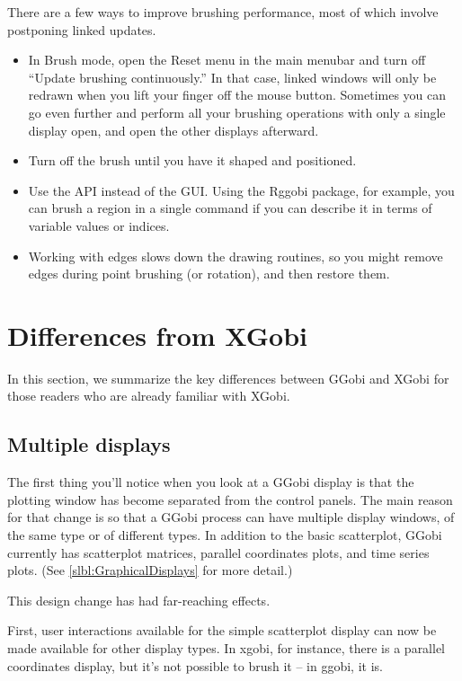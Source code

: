 \documentclass[11pt]{article}
\begin{document}
{There are a few ways to improve brushing performance, most of which
involve postponing linked updates.  
\begin{itemize}
\item In Brush mode, open the Reset menu in the main menubar and turn off
 ``Update brushing continuously.''  In that case, linked windows will only
 be redrawn when you lift your finger off the mouse button.  Sometimes you
 can go even further and perform all your brushing operations with only
 a single display open, and open the other displays afterward.
\item Turn off the brush until you have it shaped and positioned.
\item Use the API instead of the GUI.  Using the Rggobi package, for
 example, you can brush a region in a single command if you can describe
 it in terms of variable values or indices.
\item Working with edges slows down the drawing routines, so you might
 remove edges during point brushing (or rotation), and then restore them.
\end{itemize}

\newpage
\section{Differences from XGobi}
\label{slbl:xgobi}

In this section, we summarize the key differences between GGobi
and XGobi for those readers who are already familiar with XGobi.

\subsection {Multiple displays}

The first thing you'll notice when you look at a GGobi display is
that the plotting window has become separated from the control
panels.  The main reason for that change is so that a GGobi process
can have multiple display windows, of the same type or of different
types.  In addition to the basic scatterplot, GGobi currently has
scatterplot matrices, parallel coordinates plots, and time series
plots.  (See \ref{slbl:GraphicalDisplays} for more detail.)

This design change has had far-reaching effects.

First, user interactions available for the simple scatterplot display
can now be made available for other display types.  In xgobi, for
instance, there is a parallel coordinates display, but it's not
possible to brush it -- in ggobi, it is.

}
\end{document}
